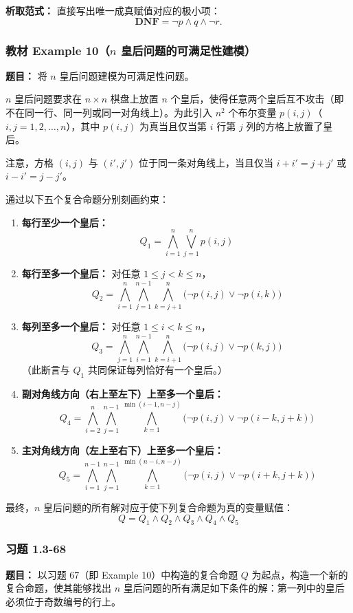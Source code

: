 \documentclass[11pt,UTF8]{article}
\begin{document}
\textbf{析取范式：} 直接写出唯一成真赋值对应的极小项：
\[ \mathbf{DNF} = \neg p \land q \land \neg r. \]

\subsubsection*{教材 Example 10（$n$ 皇后问题的可满足性建模）}
\textbf{题目：} 将 $n$ 皇后问题建模为可满足性问题。

$n$ 皇后问题要求在 $n \times n$ 棋盘上放置 $n$ 个皇后，使得任意两个皇后互不攻击（即不在同一行、同一列或同一对角线上）。为此引入 $n^2$ 个布尔变量 $p(i,j)$（$i,j = 1,2,\dots,n$），其中 $p(i,j)$ 为真当且仅当第 $i$ 行第 $j$ 列的方格上放置了皇后。

注意，方格 $(i,j)$ 与 $(i',j')$ 位于同一条对角线上，当且仅当 $i+i' = j+j'$ 或 $i-i' = j-j'$。

通过以下五个复合命题分别刻画约束：

\begin{enumerate}
    \item \textbf{每行至少一个皇后：}
    \[ Q_1 = \bigwedge_{i=1}^{n} \bigvee_{j=1}^{n} p(i,j) \]
    
    \item \textbf{每行至多一个皇后：} 对任意 $1 \le j < k \le n$，
    \[ Q_2 = \bigwedge_{i=1}^{n} \bigwedge_{j=1}^{n-1} \bigwedge_{k=j+1}^{n} \bigl(\neg p(i,j) \lor \neg p(i,k)\bigr) \]
    
    \item \textbf{每列至多一个皇后：} 对任意 $1 \le i < k \le n$，
    \[ Q_3 = \bigwedge_{j=1}^{n} \bigwedge_{i=1}^{n-1} \bigwedge_{k=i+1}^{n} \bigl(\neg p(i,j) \lor \neg p(k,j)\bigr) \]
    （此断言与 $Q_1$ 共同保证每列恰好有一个皇后。）
    
    \item \textbf{副对角线方向（右上至左下）上至多一个皇后：}
    \[ Q_4 = \bigwedge_{i=2}^{n} \bigwedge_{j=1}^{n-1} \bigwedge_{k=1}^{\min(i-1,n-j)} \bigl(\neg p(i,j) \lor \neg p(i-k,j+k)\bigr) \]
    
    \item \textbf{主对角线方向（左上至右下）上至多一个皇后：}
    \[ Q_5 = \bigwedge_{i=1}^{n-1} \bigwedge_{j=1}^{n-1} \bigwedge_{k=1}^{\min(n-i,n-j)} \bigl(\neg p(i,j) \lor \neg p(i+k,j+k)\bigr) \]
\end{enumerate}

最终，$n$ 皇后问题的所有解对应于使下列复合命题为真的变量赋值：
\[ Q = Q_1 \land Q_2 \land Q_3 \land Q_4 \land Q_5 \]

\subsubsection*{习题 1.3-68}
\textbf{题目：} 以习题 67（即 Example 10）中构造的复合命题 $Q$ 为起点，构造一个新的复合命题，使其能够找出 $n$ 皇后问题的所有满足如下条件的解：第一列中的皇后必须位于奇数编号的行上。
\end{document}
